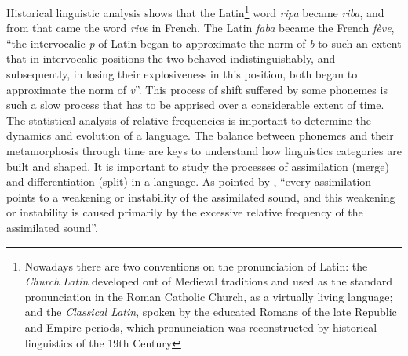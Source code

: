 Historical linguistic analysis shows that the Latin\footnote{Nowadays there are two conventions on the pronunciation of Latin: the \emph{Church Latin} 
developed out of Medieval traditions and used as the standard pronunciation in the Roman Catholic Church, as a virtually living language; 
and the \emph{Classical Latin}, spoken by the educated Romans of the late Republic and Empire periods, which pronunciation was reconstructed by 
historical linguistics of the 19th Century} 
word \textit{ripa} became \textit{riba}, and from that came the word \textit{rive} in French. The Latin \textit{faba} became the French \textit{fève}, 
``the intervocalic \textit{p} of Latin began to approximate the norm of \textit{b} to such an extent that in intervocalic positions the two behaved 
indistinguishably, and subsequently, in losing their explosiveness in this position, both began to approximate the norm of \textit{v}''\citep{zipf1949}. 
This process of shift suffered by some phonemes is such a slow process that has to be apprised over a considerable extent of time. The statistical analysis 
of relative frequencies is important to determine the dynamics and evolution of a language. The balance between phonemes and their metamorphosis through time are keys to understand 
how linguistics categories are built and shaped. It is important to study the processes of assimilation (merge) and differentiation (split) in a language. 
As pointed by \cite{zipf1949}, ``every assimilation points to a weakening or instability of the assimilated sound, and this weakening or instability is caused 
primarily by the excessive relative frequency of the assimilated sound''.

